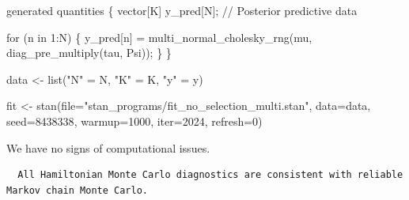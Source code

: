 \documentclass[
  letterpaper,
  DIV=11,
  numbers=noendperiod]{scrartcl}
\newenvironment{Shaded}{\begin{snugshade}}{\end{snugshade}}
\newcommand{\AttributeTok}[1]{\textcolor[rgb]{0.40,0.45,0.13}{#1}}
\newcommand{\CommentTok}[1]{\textcolor[rgb]{0.37,0.37,0.37}{#1}}
\newcommand{\ControlFlowTok}[1]{\textcolor[rgb]{0.00,0.23,0.31}{#1}}
\newcommand{\DataTypeTok}[1]{\textcolor[rgb]{0.68,0.00,0.00}{#1}}
\newcommand{\DecValTok}[1]{\textcolor[rgb]{0.68,0.00,0.00}{#1}}
\newcommand{\FunctionTok}[1]{\textcolor[rgb]{0.28,0.35,0.67}{#1}}
\newcommand{\KeywordTok}[1]{\textcolor[rgb]{0.00,0.23,0.31}{#1}}
\newcommand{\NormalTok}[1]{\textcolor[rgb]{0.00,0.23,0.31}{#1}}
\newcommand{\OtherTok}[1]{\textcolor[rgb]{0.00,0.23,0.31}{#1}}
\newcommand{\SpecialCharTok}[1]{\textcolor[rgb]{0.37,0.37,0.37}{#1}}
\newcommand{\StringTok}[1]{\textcolor[rgb]{0.13,0.47,0.30}{#1}}
\begin{document}
\begin{codelisting}
\begin{Shaded}
\begin{Highlighting}[]
\KeywordTok{generated quantities}\NormalTok{ \{}
  \DataTypeTok{vector}\NormalTok{[K] y\_pred[N]; }\CommentTok{// Posterior predictive data}
  
  \ControlFlowTok{for}\NormalTok{ (n }\ControlFlowTok{in} \DecValTok{1}\NormalTok{:N) \{}
\NormalTok{    y\_pred[n] = multi\_normal\_cholesky\_rng(mu, diag\_pre\_multiply(tau, Psi));}
\NormalTok{  \}}
\NormalTok{\}}
\end{Highlighting}
\end{Shaded}

\end{codelisting}

\begin{Shaded}
\begin{Highlighting}[]
\NormalTok{data }\OtherTok{\textless{}{-}} \FunctionTok{list}\NormalTok{(}\StringTok{"N"} \OtherTok{=}\NormalTok{ N, }\StringTok{"K"} \OtherTok{=}\NormalTok{ K, }\StringTok{"y"} \OtherTok{=}\NormalTok{ y)}

\NormalTok{fit }\OtherTok{\textless{}{-}} \FunctionTok{stan}\NormalTok{(}\AttributeTok{file=}\StringTok{"stan\_programs/fit\_no\_selection\_multi.stan"}\NormalTok{,}
            \AttributeTok{data=}\NormalTok{data, }\AttributeTok{seed=}\DecValTok{8438338}\NormalTok{,}
            \AttributeTok{warmup=}\DecValTok{1000}\NormalTok{, }\AttributeTok{iter=}\DecValTok{2024}\NormalTok{, }\AttributeTok{refresh=}\DecValTok{0}\NormalTok{)}
\end{Highlighting}
\end{Shaded}

We have no signs of computational issues.

\begin{Shaded}
\end{Shaded}

\begin{verbatim}
  All Hamiltonian Monte Carlo diagnostics are consistent with reliable
Markov chain Monte Carlo.
\end{verbatim}
\end{document}
